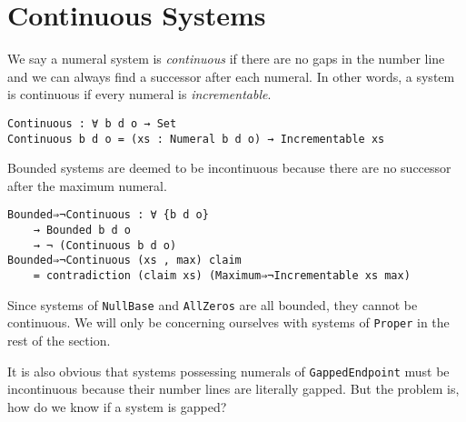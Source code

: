 \documentclass[\main/thesis.tex]{subfiles}
\begin{document}
\section{Continuous Systems}\label{continuous}

We say a numeral system is \textit{continuous} if there are no gaps in the number
line and we can always find a successor after each numeral.
In other words, a system is continuous if every numeral is \textit{incrementable}.

\begin{lstlisting}
Continuous : ∀ b d o → Set
Continuous b d o = (xs : Numeral b d o) → Incrementable xs
\end{lstlisting}

Bounded systems are deemed to be incontinuous because there are no successor
after the maximum numeral.

\begin{lstlisting}
Bounded⇒¬Continuous : ∀ {b d o}
    → Bounded b d o
    → ¬ (Continuous b d o)
Bounded⇒¬Continuous (xs , max) claim
    = contradiction (claim xs) (Maximum⇒¬Incrementable xs max)
\end{lstlisting}

Since systems of \lstinline|NullBase| and \lstinline|AllZeros| are all bounded,
they cannot be continuous. We will only be concerning ourselves with systems of
\lstinline|Proper| in the rest of the section.

It is also obvious that systems possessing numerals of \lstinline|GappedEndpoint|
must be incontinuous because their number lines are literally gapped.
But the problem is, how do we know if a system is gapped?
\end{document}
